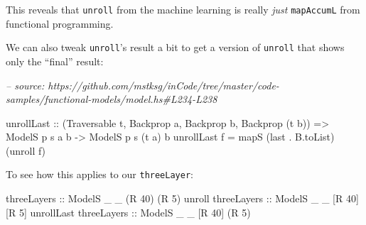\documentclass[]{article}
\newenvironment{Shaded}{}{}
\newcommand{\CommentTok}[1]{\textcolor[rgb]{0.38,0.63,0.69}{\textit{#1}}}
\newcommand{\DataTypeTok}[1]{\textcolor[rgb]{0.56,0.13,0.00}{#1}}
\newcommand{\DecValTok}[1]{\textcolor[rgb]{0.25,0.63,0.44}{#1}}
\newcommand{\FunctionTok}[1]{\textcolor[rgb]{0.02,0.16,0.49}{#1}}
\newcommand{\KeywordTok}[1]{\textcolor[rgb]{0.00,0.44,0.13}{\textbf{#1}}}
\newcommand{\NormalTok}[1]{#1}
\newcommand{\OtherTok}[1]{\textcolor[rgb]{0.00,0.44,0.13}{#1}}
\begin{document}
\begin{Shaded}
\end{Shaded}

This reveals that \texttt{unroll} from the machine learning is really
\emph{just} \texttt{mapAccumL} from functional programming.

We can also tweak \texttt{unroll}'s result a bit to get a version of
\texttt{unroll} that shows only the ``final'' result:

\begin{Shaded}
\begin{Highlighting}[]
\CommentTok{-- source: https://github.com/mstksg/inCode/tree/master/code-samples/functional-models/model.hs#L234-L238}

\NormalTok{unrollLast}
\OtherTok{    ::}\NormalTok{ (}\DataTypeTok{Traversable}\NormalTok{ t, }\DataTypeTok{Backprop}\NormalTok{ a, }\DataTypeTok{Backprop}\NormalTok{ b, }\DataTypeTok{Backprop}\NormalTok{ (t b))}
    \OtherTok{=>} \DataTypeTok{ModelS}\NormalTok{ p s    a  b}
    \OtherTok{->} \DataTypeTok{ModelS}\NormalTok{ p s (t a) b}
\NormalTok{unrollLast f }\FunctionTok{=}\NormalTok{ mapS (last }\FunctionTok{.}\NormalTok{ B.toList) (unroll f)}
\end{Highlighting}
\end{Shaded}

To see how this applies to our \texttt{threeLayer}:

\begin{Shaded}
\begin{Highlighting}[]
\OtherTok{threeLayers            ::} \DataTypeTok{ModelS}\NormalTok{ _ _ (}\DataTypeTok{R} \DecValTok{40}\NormalTok{) (}\DataTypeTok{R} \DecValTok{5}\NormalTok{)}
\NormalTok{unroll}\OtherTok{ threeLayers     ::} \DataTypeTok{ModelS}\NormalTok{ _ _ [}\DataTypeTok{R} \DecValTok{40}\NormalTok{] [}\DataTypeTok{R} \DecValTok{5}\NormalTok{]}
\NormalTok{unrollLast}\OtherTok{ threeLayers ::} \DataTypeTok{ModelS}\NormalTok{ _ _ [}\DataTypeTok{R} \DecValTok{40}\NormalTok{] (}\DataTypeTok{R} \DecValTok{5}\NormalTok{)}
\end{Highlighting}
\end{Shaded}
\end{document}

